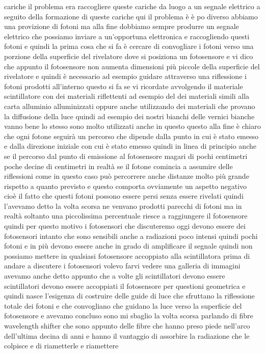 {cariche il problema era raccogliere queste cariche da luogo a un segnale elettrico a seguito della formazione di queste cariche qui il problema è è po diverso abbiamo una provizione di fotoni ma alla fine dobbiamo sempre produrre un segnale elettrico che possiamo inviare a un'opportuna elettronica e raccogliendo questi fotoni e quindi la prima cosa che si fa è cercare di convogliare i fotoni verso una porzione della superficie del rivelatore dove si posiziona un fotosensore e vi dico che appunto il fotosensore non aumenta dimensioni più piccole della superficie del rivelatore e quindi è necessario ad esempio guidare attraverso una riflessione i fotoni prodotti all'interno questo si fa se vi ricordate avvolgendo il materiale scintillatore con dei materiali riflettenti ad esempio del dei materiali simili alla carta alluminio alluminizzati oppure anche utilizzando dei materiali che provano la diffusione della luce quindi ad esempio dei nostri bianchi delle vernici bianche vanno bene lo stesso sono molto utilizzati anche in questo questo alla fine è chiaro che ogni fotone seguirà un percorso che dipende dalla punto in cui è stato emesso e dalla direzione iniziale con cui è stato emesso quindi in linea di principio anche se il percorso dal punto di emissione al fotosensore magari di pochi centimetri poche decine di centimetri in realtà se il fotone comincia a assumire delle riflessioni come in questo caso può percorrere anche distanze molto più grande rispetto a quanto previsto e questo comporta ovviamente un aspetto negativo cioè il fatto che questi fotoni possono essere persi senza essere rivelati quindi l'avevamo detto la volta scorsa ne venvano prodotti parecchi di fotoni ma in realtà soltanto una piccolissima percentuale riesce a raggiungere il fotosensore quindi per questo motivo i fotosensori che discuteremo oggi devono essere dei fotosensori intanto che sono sensibili anche a radiazioni poco intensi quindi pochi fotoni e in più devono essere anche in grado di amplificare il segnale quindi non possiamo mettere in qualsiasi fotosensore accoppiato alla scintillatora prima di andare a discutere i fotosensori volevo farvi vedere una galleria di immagini avevamo anche detto appunto che a volte gli scintillatori devono essere scintillatori devono essere accoppiati il fotosensore per questioni geometrica e quindi nasce l'esigenza di costruire delle guide di luce che sfruttano la riflessione totale dei fotoni e che convogliano che guidano la luce verso la superficie del fotosensore e avevamo concluso sono mi sbaglio la volta scorsa parlando di fibre wavelength shifter che sono appunto delle fibre che hanno preso piede nell'arco dell'ultima decina di anni e hanno il vantaggio di assorbire la radiazione che le colpisce e di riametterle e riamettere

}
